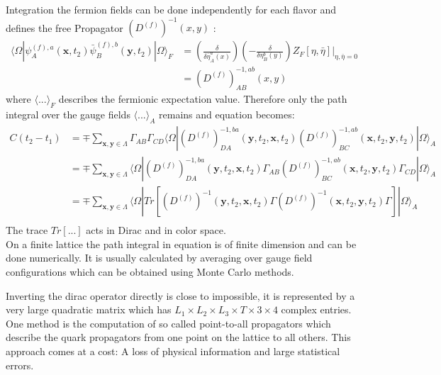         \noindent
        Integration the fermion fields can be done independently for each flavor and defines the free Propagator $(D^{(f)})^{-1}(x,y)$ \cite{qcd2_script_wagner}:
        \begin{equation}
            \begin{aligned}
                \langle\Omega|\psi^{(f),a}_A(\textbf{x}, t_2)\bar{\psi}^{(f),b}_B(\textbf{y}, t_2)|\Omega\rangle_F &= 
                (\frac{\delta}{\delta\bar{\eta}^a_A(x)})(-\frac{\delta}{\delta{\eta}^b_B(y)})Z_F[\eta,\bar{\eta}]\Big |_{\eta,\bar{\eta}=0}\\
                &= (D^{(f)})_{AB}^{-1,ab}(x,y)
            \end{aligned}
        \end{equation}
        where $\langle...\rangle_F$ describes the fermionic expectation value. Therefore only the path integral over the gauge fields $\langle...\rangle_A$ remains and equation  becomes:
        \begin{equation}\label{correlator_final}
            \begin{aligned}
                C(t_2 - t_1) &= \mp \sum_{\textbf{x},\textbf{y}\in\Lambda}\Gamma_{AB}\Gamma_{CD}
                \langle\Omega|(D^{(f)})_{DA}^{-1,ba}(\textbf{y},t_2,\textbf{x},t_2)
                (D^{(f)})_{BC}^{-1,ab}(\textbf{x},t_2,\textbf{y},t_2)|\Omega\rangle_A\\
                &= \mp \sum_{\textbf{x},\textbf{y}\in\Lambda}
                \langle\Omega|(D^{(f)})_{DA}^{-1,ba}(\textbf{y},t_2,\textbf{x},t_2)\Gamma_{AB}
                (D^{(f)})_{BC}^{-1,ab}(\textbf{x},t_2,\textbf{y},t_2)\Gamma_{CD}|\Omega\rangle_A\\
                &= \mp \sum_{\textbf{x},\textbf{y}\in\Lambda}
                \langle\Omega|Tr[(D^{(f)})^{-1}(\textbf{y},t_2,\textbf{x},t_2)\Gamma
                (D^{(f)})^{-1}(\textbf{x},t_2,\textbf{y},t_2)\Gamma]|\Omega\rangle_A\\
            \end{aligned}
        \end{equation}
        The trace $Tr[...]$ acts in Dirac and in color space.\\
        
        \noindent
        On a finite lattice the path integral in equation  is of finite dimension and can be done numerically. It is usually calculated by averaging over gauge field configurations which can be obtained using Monte Carlo methods.
        
        Inverting the dirac operator directly is close to impossible, it is represented by a very large quadratic matrix which has $L_1 \times L_2 \times L_3 \times T \times 3 \times 4$ complex entries. One method is the computation of so called point-to-all propagators \cite{four_quark_correlation_functions} which describe the quark propagators from one point on the lattice to all others. This approach comes at a cost: A loss of physical information and large statistical errors.